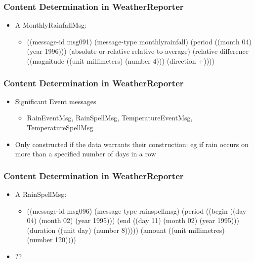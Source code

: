\documentclass[compress,color=usenames]{beamer}
\begin{document}
\begin{frame}
\frametitle{Content Determination in WeatherReporter}

\label{f128}
\begin{itemize}
\item { {A MonthlyRainfallMsg:}}
\begin{itemize}
\item 
{((message-id msg091)
 (message-type monthlyrainfall)
 (period ((month 04)
 (year 1996)))
 (absolute-or-relative relative-to-average)
 (relative-difference ((magnitude ((unit millimeters)
   (number 4)))
  (direction +))))}
\end{itemize}
\end{itemize}


\end{frame}

\begin{frame}
\frametitle{Content Determination in WeatherReporter}

\label{f130}
\begin{itemize}
\item { {Significant Event messages}}
\begin{itemize}
\item RainEventMsg, 
RainSpellMsg, 
TemperatureEventMsg, 
TemperatureSpellMsg
\end{itemize}
\item { {Only constructed if the data warrants their construction: eg if rain occurs on more than a specified number of days in a row}}
\end{itemize}

 
\end{frame}

\begin{frame}
\frametitle{Content Determination in WeatherReporter}

\label{f132}
\begin{itemize}
\item { {A RainSpellMsg:}}
\begin{itemize}
\item {
((message-id msg096)
 (message-type rainspellmsg)
 (period ((begin ((day 04)
  (month 02)
  (year 1995)))
 (end ((day 11)
 (month 02)
 (year 1995)))
 (duration ((unit day)
  (number 8)))))
 (amount ((unit millimetres)
 (number 120))))}
\end{itemize}
\item { {{}}}??
\end{itemize}

 
\end{frame}
\end{document}
